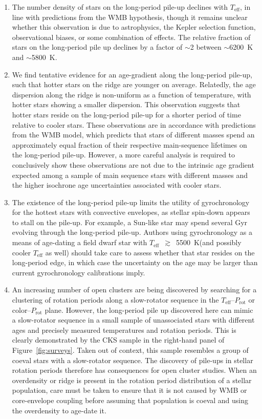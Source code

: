 \documentclass[linenumbers,tighten,trackchanges,twocolumn]{aastex631}
\newcommand{\teffmin}{5500~K\xspace}
\newcommand{\teff}{\ensuremath{T_{\mathrm{eff}}}\xspace}
\newcommand{\prot}{\ensuremath{P_\mathrm{rot}}\xspace}
\begin{document}
\begin{enumerate}
    \item The number density of stars on the long-period pile-up declines with \teff, in line with predictions from the WMB hypothesis, though it remains unclear whether this observation is due to astrophysics, the Kepler selection function, observational biases, or some combination of effects. The relative fraction of stars on the long-period pile up declines by a factor of $\sim$2 between $\sim$6200~K and $\sim$5800~K. 
    
    \item We find tentative evidence for an age-gradient along the long-period pile-up, such that hotter stars on the ridge are younger on average. Relatedly, the age dispersion along the ridge is non-uniform as a function of temperature, with hotter stars showing a smaller dispersion. This observation suggests that hotter stars reside on the long-period pile-up for a shorter period of time relative to cooler stars. These observations are in accordance with predictions from the WMB model, which predicts that stars of different masses spend an approximately equal fraction of their respective main-sequence lifetimes on the long-period pile-up. However, a more careful analysis is required to conclusively show these observations are not due to the intrinsic age gradient expected among a sample of main sequence stars with different masses and the higher isochrone age uncertainties associated with cooler stars.
    
    \item The existence of the long-period pile-up limits the utility of gyrochronology for the hottest stars with convective envelopes, as stellar spin-down appears to stall on the pile-up. For example, a Sun-like star may spend several Gyr evolving through the long-period pile-up. Authors using gyrochronology as a means of age-dating a field dwarf star with \teff~$\gtrsim$~\teffmin (and possibly cooler \teff as well) should take care to assess whether that star resides on the long-period edge, in which case the uncertainty on the age may be larger than current gyrochronology calibrations imply.
    
    \item {\color{red} An increasing number of open clusters are being discovered by searching for a clustering of rotation periods along a slow-rotator sequence in the \teff–\prot or color–\prot plane. However, the long-period pile up discovered here can mimic a slow-rotator sequence in a small sample of unassociated stars with different ages and precisely measured temperatures and rotation periods. This is clearly demonstrated by the CKS sample in the right-hand panel of Figure~\ref{fig:surveys}. Taken out of context, this sample resembles a group of coeval stars with a slow-rotator sequence. The discovery of pile-ups in stellar rotation periods therefore has consequences for open cluster studies. When an overdensity or ridge is present in the rotation period distribution of a stellar population, care must be taken to ensure that it is not caused by WMB or core-envelope coupling before assuming that population is coeval and using the overdensity to age-date it.} 
    
\end{enumerate}
\end{document}
